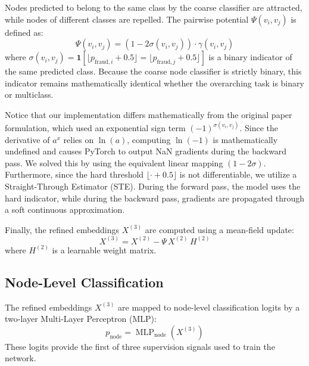 Nodes predicted to belong to the same class by the coarse classifier are attracted, while nodes of different classes are repelled. The pairwise potential $\Psi(v_i, v_j)$ is defined as:
\begin{equation}
  \Psi(v_i, v_j) = (1 - 2\sigma(v_i, v_j)) \cdot \gamma(v_i, v_j)
\end{equation}
where $\sigma(v_i, v_j) = \mathbf{1}\!\left[ \lfloor p_{\text{fraud},i} + 0.5 \rfloor = \lfloor p_{\text{fraud},j} + 0.5 \rfloor \right]$ is a binary indicator of the same predicted class. Because the coarse node classifier is strictly binary, this indicator remains mathematically identical whether the overarching task is binary or multiclass.

Notice that our implementation differs mathematically from the original paper formulation, which used an exponential sign term $(-1)^{\sigma(v_i, v_j)}$. Since the derivative of $a^x$ relies on $\ln(a)$, computing $\ln(-1)$ is mathematically undefined and causes PyTorch to output NaN gradients during the backward pass. We solved this by using the equivalent linear mapping $(1 - 2\sigma)$. Furthermore, since the hard threshold $\lfloor \cdot + 0.5 \rfloor$ is not differentiable, we utilize a Straight-Through Estimator (STE). During the forward pass, the model uses the hard indicator, while during the backward pass, gradients are propagated through a soft continuous approximation.

Finally, the refined embeddings $X^{(3)}$ are computed using a mean-field update:
\begin{equation}
  X^{(3)} = X^{(2)} - \Psi\, X^{(2)}\, H^{(2)}
\end{equation}
where $H^{(2)}$ is a learnable weight matrix.

\subsection{Node-Level Classification}
\label{sec:node_clf}
The refined embeddings $X^{(3)}$ are mapped to node-level classification logits by a two-layer Multi-Layer Perceptron (MLP):
\begin{equation}
  p_{\text{node}} = \operatorname{MLP}_{\text{node}}\!\left(X^{(3)}\right)
\end{equation}
These logits provide the first of three supervision signals used to train the network.


